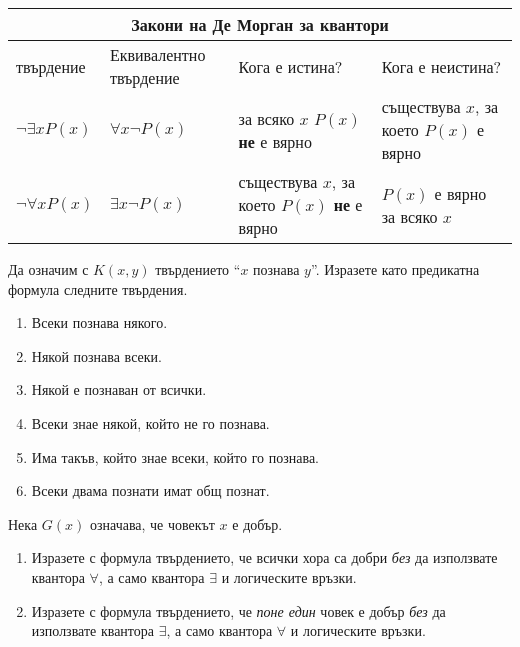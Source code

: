 \bigskip
\begin{tabular}{|l|p{2.5cm}|p{3.2cm}|p{3cm}|}
  \hline
  \multicolumn{4}{|c|}{{\bf Закони на Де Морган за квантори}}\\
  \hline
  твърдение & Еквивалентно твърдение & Кога е истина? & Кога е неистина?\\
  \hline
  $\neg \exists x P(x)$ & $\forall x \neg P(x)$ & за всяко $x$ $P(x)$ {\bf не} е вярно & съществува $x$, за което $P(x)$ е вярно \\
  \hline
  $\neg \forall x P(x)$ & $\exists x \neg P(x)$ & съществува $x$, за което $P(x)$ {\bf не} е вярно & $P(x)$ е вярно за всяко $x$\\
  \hline
\end{tabular}  
\bigskip



\begin{problem}
  Да означим с $K(x,y)$ твърдението ``$x$ познава $y$''.
  Изразете като предикатна формула следните твърдения.
  \begin{enumerate}[1)]
  \item
    Всеки познава някого.
  \item
    Някой познава всеки.
  \item
    Някой е познаван от всички.
  \item
    Всеки знае някой, който не го познава.
  \item
    Има такъв, който знае всеки, който го познава.
  \item
    Всеки двама познати имат общ познат.
  \end{enumerate}
\end{problem}

\begin{problem}
  Нека $G(x)$ означава, че човекът $x$ е добър.
  \begin{enumerate}[1)]
  \item
    Изразете с формула твърдението, че всички хора са добри {\em без}
    да използвате квантора $\forall$, а само квантора $\exists$ и логическите връзки.
  \item
    Изразете с формула твърдението, че {\em поне един} човек е добър {\em без}
    да използвате квантора $\exists$, а само квантора $\forall$ и логическите връзки.
  \end{enumerate}
\end{problem}

